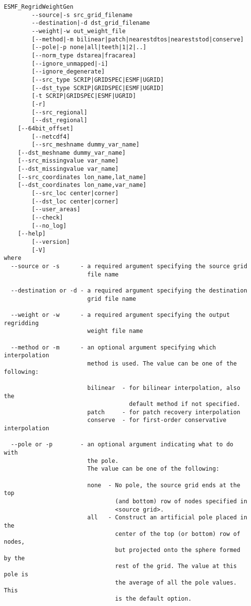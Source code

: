 \begin{verbatim}
ESMF_RegridWeightGen  
        --source|-s src_grid_filename
        --destination|-d dst_grid_filename
        --weight|-w out_weight_file
        [--method|-m bilinear|patch|nearestdtos|neareststod|conserve]
        [--pole|-p none|all|teeth|1|2|..]
        [--norm_type dstarea|fracarea]
        [--ignore_unmapped|-i]
        [--ignore_degenerate]
        [--src_type SCRIP|GRIDSPEC|ESMF|UGRID]
        [--dst_type SCRIP|GRIDSPEC|ESMF|UGRID]
        [-t SCRIP|GRIDSPEC|ESMF|UGRID]
        [-r]
        [--src_regional]
        [--dst_regional]
	[--64bit_offset]
        [--netcdf4]
        [--src_meshname dummy_var_name]
	[--dst_meshname dummy_var_name]
	[--src_missingvalue var_name]
	[--dst_missingvalue var_name]
	[--src_coordinates lon_name,lat_name]
	[--dst_coordinates lon_name,var_name]
        [--src_loc center|corner]
        [--dst_loc center|corner]
        [--user_areas]
        [--check]
        [--no_log]
	[--help]
        [--version]
        [-V]
where
  --source or -s      - a required argument specifying the source grid
                        file name

  --destination or -d - a required argument specifying the destination
                        grid file name

  --weight or -w      - a required argument specifying the output regridding
                        weight file name

  --method or -m      - an optional argument specifying which interpolation
                        method is used. The value can be one of the following:

                        bilinear  - for bilinear interpolation, also the
                                    default method if not specified.
                        patch     - for patch recovery interpolation
                        conserve  - for first-order conservative interpolation

  --pole or -p        - an optional argument indicating what to do with
                        the pole.
                        The value can be one of the following:

                        none  - No pole, the source grid ends at the top
                                (and bottom) row of nodes specified in
                                <source grid>.
                        all   - Construct an artificial pole placed in the
                                center of the top (or bottom) row of nodes,
                                but projected onto the sphere formed by the
                                rest of the grid. The value at this pole is
                                the average of all the pole values. This
                                is the default option.


\end{verbatim}
